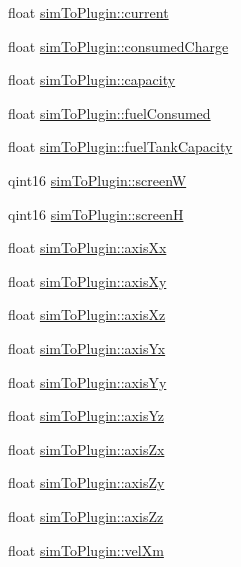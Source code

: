 \begin{DoxyCompactItemize}
\item 
float \hyperlink{group___aero_sim_r_c_ga67b8bd84d98afe25c5300ecaa1e3b1ac}{sim\-To\-Plugin\-::current}
\item 
float \hyperlink{group___aero_sim_r_c_ga408ab8a806126f8c39a224202f7784c9}{sim\-To\-Plugin\-::consumed\-Charge}
\item 
float \hyperlink{group___aero_sim_r_c_ga735a5ea26beaee930a4bd7e2d8e18398}{sim\-To\-Plugin\-::capacity}
\item 
float \hyperlink{group___aero_sim_r_c_gae96b24ccedba1107673cdc5889815f58}{sim\-To\-Plugin\-::fuel\-Consumed}
\item 
float \hyperlink{group___aero_sim_r_c_ga9d9432e29718f1a2d3e3bb4445bb3705}{sim\-To\-Plugin\-::fuel\-Tank\-Capacity}
\item 
qint16 \hyperlink{group___aero_sim_r_c_ga0e82f7a599641d119734afe4a0f4403c}{sim\-To\-Plugin\-::screen\-W}
\item 
qint16 \hyperlink{group___aero_sim_r_c_gaf9235fc17924379e9bdd0826d1111e2c}{sim\-To\-Plugin\-::screen\-H}
\item 
float \hyperlink{group___aero_sim_r_c_ga693a3fedba573cb60ae2ced78f2f55e8}{sim\-To\-Plugin\-::axis\-Xx}
\item 
float \hyperlink{group___aero_sim_r_c_gaf149495ae6cb0a4b55f124b645e0cc8d}{sim\-To\-Plugin\-::axis\-Xy}
\item 
float \hyperlink{group___aero_sim_r_c_gaf6a11ab25129a46c7195678d223f8cba}{sim\-To\-Plugin\-::axis\-Xz}
\item 
float \hyperlink{group___aero_sim_r_c_gab46b6cb491df61bb0808c6a2942f5f26}{sim\-To\-Plugin\-::axis\-Yx}
\item 
float \hyperlink{group___aero_sim_r_c_gab1c3f18d56d396a6dd95411539ffc0e8}{sim\-To\-Plugin\-::axis\-Yy}
\item 
float \hyperlink{group___aero_sim_r_c_ga7c0f6efcd45a801369e92067bc85a5ca}{sim\-To\-Plugin\-::axis\-Yz}
\item 
float \hyperlink{group___aero_sim_r_c_gac74b099d24d55ff1692b855313489324}{sim\-To\-Plugin\-::axis\-Zx}
\item 
float \hyperlink{group___aero_sim_r_c_ga28db280f796bbada439e147a61037c0f}{sim\-To\-Plugin\-::axis\-Zy}
\item 
float \hyperlink{group___aero_sim_r_c_ga62dda20d79d63155064a31a27d06e930}{sim\-To\-Plugin\-::axis\-Zz}
\item 
float \hyperlink{group___aero_sim_r_c_ga5b8ca52e6b6fcba33660c4164ff14b21}{sim\-To\-Plugin\-::vel\-Xm}
\item 

\end{DoxyCompactItemize}

